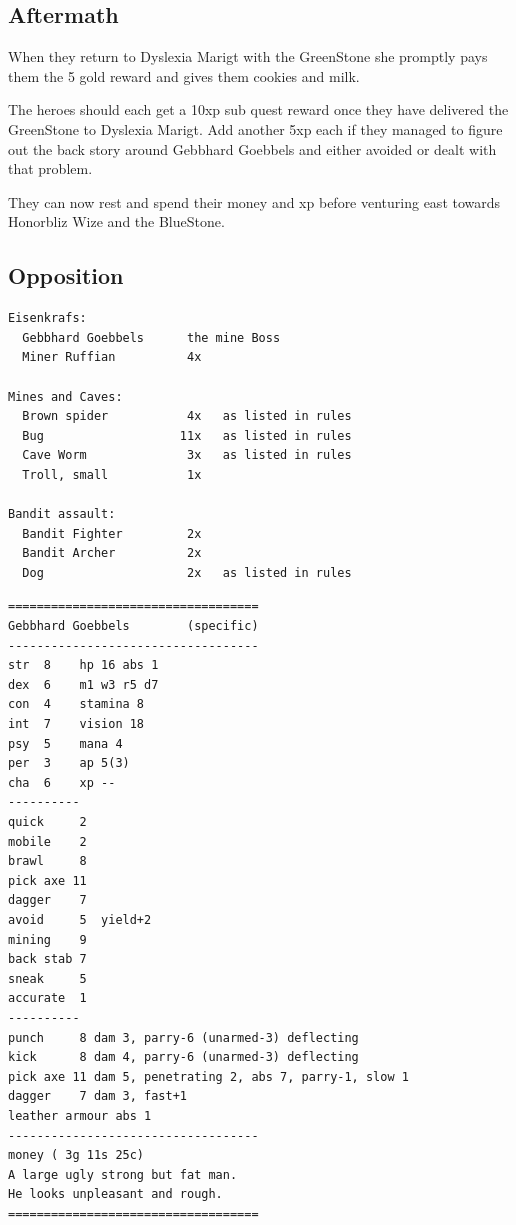 \subsection*{Aftermath}
When they return to Dyslexia Marigt with the GreenStone she promptly pays them the 5 gold reward and gives them cookies and milk.

The heroes should each get a 10xp sub quest reward once they have delivered the GreenStone to Dyslexia Marigt. Add another 5xp each if they managed to figure out the back story around Gebbhard Goebbels and either avoided or dealt with that problem.

They can now rest and spend their money and xp before venturing east towards Honorbliz Wize and the BlueStone.


\subsection*{Opposition}

\raggedbottom

\begin{samepage} \vsmall \begin{verbatim}
Eisenkrafs:
  Gebbhard Goebbels      the mine Boss
  Miner Ruffian          4x

Mines and Caves:
  Brown spider           4x   as listed in rules
  Bug                   11x   as listed in rules
  Cave Worm              3x   as listed in rules
  Troll, small           1x

Bandit assault:
  Bandit Fighter         2x
  Bandit Archer          2x
  Dog                    2x   as listed in rules
\end{verbatim} \normalsize \end{samepage}



\goodbreak \begin{samepage} \vsmall \begin{verbatim}
===================================
Gebbhard Goebbels        (specific)
-----------------------------------
str  8    hp 16 abs 1
dex  6    m1 w3 r5 d7
con  4    stamina 8
int  7    vision 18
psy  5    mana 4
per  3    ap 5(3)
cha  6    xp --
----------
quick     2
mobile    2
brawl     8
pick axe 11
dagger    7
avoid     5  yield+2
mining    9
back stab 7
sneak     5
accurate  1
----------
punch     8 dam 3, parry-6 (unarmed-3) deflecting
kick      8 dam 4, parry-6 (unarmed-3) deflecting
pick axe 11 dam 5, penetrating 2, abs 7, parry-1, slow 1
dagger    7 dam 3, fast+1
leather armour abs 1
-----------------------------------
money ( 3g 11s 25c)
A large ugly strong but fat man.
He looks unpleasant and rough.
===================================
\end{verbatim} \normalsize \end{samepage}

